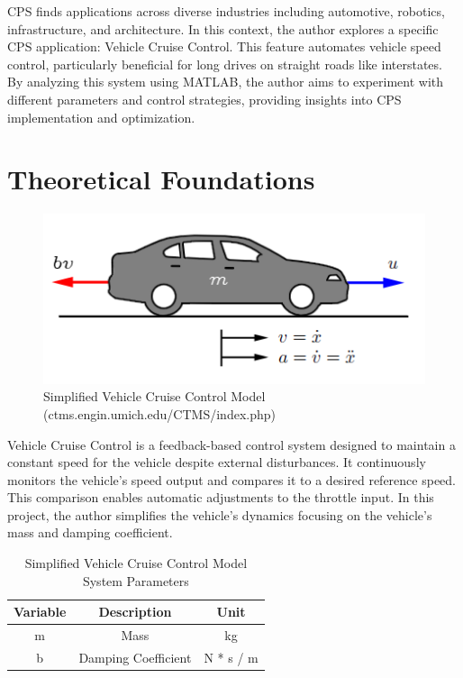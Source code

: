 \documentclass{article}
\begin{document}
CPS finds applications across diverse industries including automotive, robotics, infrastructure, and architecture. In this context, the author explores a specific CPS application: Vehicle Cruise Control. This feature automates vehicle speed control, particularly beneficial for long drives on straight roads like interstates. By analyzing this system using MATLAB, the author aims to experiment with different parameters and control strategies, providing insights into CPS implementation and optimization.

\section{Theoretical Foundations}

\begin{figure}[H]
    \centering
    \includegraphics[width=0.7\linewidth]{img/cruise_control_schematic.png}
    \caption{Simplified Vehicle Cruise Control Model (ctms.engin.umich.edu/CTMS/index.php)}
    \label{fig:enter-label}
\end{figure}

Vehicle Cruise Control is a feedback-based control system designed to maintain a constant speed for the vehicle despite external disturbances. It continuously monitors the vehicle's speed output and compares it to a desired reference speed. This comparison enables automatic adjustments to the throttle input. In this project, the author simplifies the vehicle's dynamics focusing on the vehicle's mass and damping coefficient.

\begin{table}[H]
    \centering
    \begin{tabular}{ccc}
         Variable & Description & Unit \\
         \hline
         m & Mass & kg \\ 
         b & Damping Coefficient & N * s / m \\
    \end{tabular}
    \caption{Simplified Vehicle Cruise Control Model System Parameters}
    \label{tab:units}
\end{table}
\end{document}
